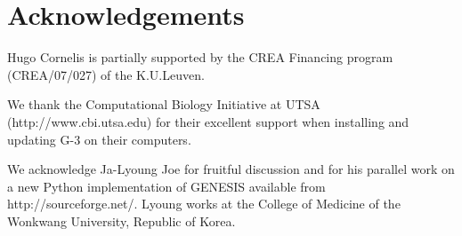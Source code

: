 \documentclass[12pt]{article}
\begin{document}
\section*{Acknowledgements}
Hugo Cornelis is partially supported by the CREA Financing program
(CREA/07/027) of the K.U.Leuven.

We thank the Computational Biology Initiative at UTSA
(http://www.cbi.utsa.edu) for their excellent support when installing
and updating G-3 on their computers.

We acknowledge Ja-Lyoung Joe for fruitful discussion and for his
parallel work on a new Python implementation of GENESIS available from
http://sourceforge.net/.  Lyoung works at the College of Medicine of
the Wonkwang University, Republic of Korea.


\cleardoublepage
{}

%
%


\end{document}
